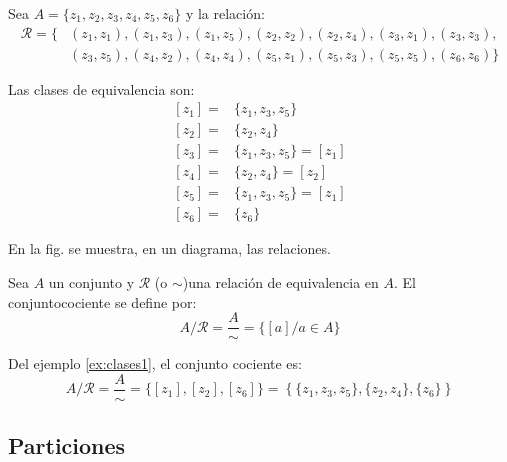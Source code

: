 \begin{fmd-example}
	Sea $A = \{ z_1, z_2, z_3, z_4, z_5, z_6 \}$ y la relación:
	\[ \begin{split}
		\mathcal{R} = \{ & (z_1, z_1), (z_1, z_3), (z_1, z_5), (z_2, z_2), (z_2, z_4), (z_3, z_1), (z_3, z_3),\\
		& (z_3, z_5), (z_4, z_2), (z_4, z_4), (z_5, z_1), (z_5, z_3), (z_5, z_5), (z_6, z_6) \}
	\end{split} \]
	
\begin{minipage}{.45\textwidth}
	Las clases de equivalencia son:
	\[ \begin{split}
		[z_1] =& \{ z_1, z_3, z_5 \}\\
		[z_2] = & \{ z_2, z_4 \}\\
		[z_3] = & \{ z_1, z_3, z_5 \} = [z_1]\\
		[z_4] = & \{ z_2, z_4 \} = [z_2]\\
		[z_5] = & \{ z_1, z_3, z_5 \} = [z_1]\\
		[z_6] = & \{ z_6\}
	\end{split} \]
\end{minipage}
\begin{minipage}{.45\textwidth}
	\begin{figure}[H]
		\centering
		
		\caption*{}
		\label{fig:clases1}
	\end{figure}
\end{minipage}

En la fig. se muestra, en un diagrama, las relaciones.
\label{ex:clases1}
\end{fmd-example}

\begin{fmd-definition} 
	Sea $A$ un conjunto y $\mathcal{R}$ (o $\sim$)una relación de equivalencia en $A$. El \gls{conjuntocociente} se define por:
	\[ A/\mathcal{R} = \frac{A}{\sim} = \{ [a] / a \in A \}\]
\end{fmd-definition}

\begin{fmd-example}
	Del ejemplo \ref{ex:clases1}, el conjunto cociente es:
	\[ A/ \mathcal{R} = \frac{A}{\sim} = \{ [z_1], [z_2], [z_6] \} = \left\{ \{ z_1, z_3, z_5 \}, \{ z_2, z_4 \}, \{ z_6 \} \right\} \] 
\end{fmd-example}

\subsection{Particiones} \label{sec:particiones}
\vspace{3mm}

